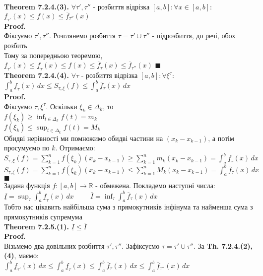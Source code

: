 \documentclass[a4paper, 14pt]{extarticle}
\def\huge{\displaystyle}
\def\bigline{\vspace{5mm}\\}
\def\th#1{\textbf{Theorem {#1}}}
\def\proof{\textbf{Proof.}\\}
\def\bigline{\vspace{5mm}\\}
\def\qed{$\blacksquare$}
\begin{document}
\th{7.2.4.(3).} $\forall \tau', \tau''$ - розбиття відрізка $[a,b]: \forall x \in [a,b]:$\\
$\underline{f}_{\tau'}(x) \leq f(x) \leq \overline{f}_{\tau''}(x)$\\
\proof
Фіксуємо $\tau', \tau''$. Розглянемо розбиття $\tau = \tau' \cup \tau''$ - підрозбиття, до речі, обох розбить\\
Тому за попередньою теоремою,\\
$\underline{f}_{\tau'}(x) \leq \underline{f}_{\tau}(x) \leq f(x) \leq \overline{f}_{\tau}(x) \leq \overline{f}_{\tau''}(x)$ \qed
\bigline
\th{7.2.4.(4).} $\forall \tau$ - розбиття відрізка $[a,b]: \forall \xi^{\tau}:$\\
$\huge \int_a^b \underline{f}_{\tau}(x)\,dx \leq S_{\tau, \xi}(f) \leq \int_a^b \overline{f}_{\tau}(x)\,dx$\\
\proof
Фіксуємо $\tau, \xi^{\tau}$. Оскільки $\xi_k \in \Delta_k$, то\\
$\huge f(\xi_k) \geq \inf_{t \in \Delta_k} f(t) = m_k$\\
$\huge f(\xi_k) \leq \sup_{t \in \Delta_k} f(t) = M_k$\\
Обидві нерівності ми помножимо обидві частини на $(x_k - x_{k-1})$, а потім просумуємо по $k$. Отримаємо:\\
$\huge S_{\tau, \xi}(f) = \sum_{k=1}^n f(\xi_k)(x_k-x_{k-1}) \geq \sum_{k=1}^n m_k(x_k-x_{k-1}) = \int_a^b \underline{f}_{\tau}(x)\,dx$\\
$\huge S_{\tau, \xi}(f) = \sum_{k=1}^n f(\xi_k)(x_k-x_{k-1}) \leq \sum_{k=1}^n M_k(x_k-x_{k-1}) = \int_a^b \overline{f}_{\tau}(x)\,dx$ \qed
\bigline
Задана функція $f: [a,b] \to \mathbb{R}$ - обмежена. Покладемо наступні числа:\\
$\underline{I} = \huge \sup_{\tau} \int_a^b \underline{f}_{\tau}(x)\,dx \hspace{1cm} \overline{I} = \huge \inf_{\tau} \int_a^b \overline{f}_{\tau}(x)\,dx$\\
Тобто нас цікавить найбільша сума з прямокутників інфінума та найменша сума з прямокутників супремума\\
\th{7.2.5.(1).} $\underline{I} \leq \overline{I}$\\
\proof
Візьмемо два довільних розбиття $\tau', \tau''$. Зафіксуємо $\tau = \tau' \cup \tau''$. За \textbf{Th. 7.2.4.(2),(4)}, маємо:\\
$\huge \int_a^b \underline{f}_{\tau'}(x)\,dx \leq \int_a^b \underline{f}_{\tau}(x) \leq \int_a^b \overline{f}_{\tau}(x)\,dx \leq \int_a^b \overline{f}_{\tau''}(x)\,dx$\\
\end{document}
